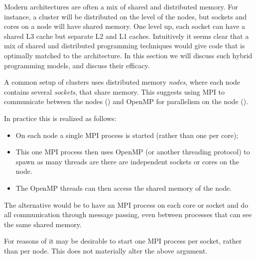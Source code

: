 
Modern architectures are often a mix of shared and distributed
memory. For instance, a cluster will be distributed on the level of
the nodes, but sockets and cores on a node will have shared
memory. One level up, each socket can have a shared L3 cache but
separate L2 and L1 caches. Intuitively it seems clear that a mix of
shared and distributed programming techniques would give code
that is optimally matched to the architecture. In this section we will
discuss such hybrid programming models, and discuss their efficacy.

A common setup of clusters uses distributed memory
\emph{nodes}, where each node contains several
\emph{sockets}, that share memory. This suggests
using MPI to communicate between the nodes
() and OpenMP for parallelism on
the node ().

In practice this is realized as follows:
\begin{itemize}
\item On each node a single MPI process is started (rather than one
  per core);
\item This one MPI process then uses OpenMP (or another threading
  protocol) to spawn as many threads are there are independent sockets
  or cores on the node.
\item The OpenMP threads can then access the shared memory of the node.
\end{itemize}
The alternative would be to have an MPI process on each core or
socket and do all communication through message passing, even between
processes that can see the same shared memory.

\begin{remark}
  For reasons of  it may be desirable to start
  one MPI process per socket, rather than per node.
  This does not materially alter the above argument.
\end{remark}

